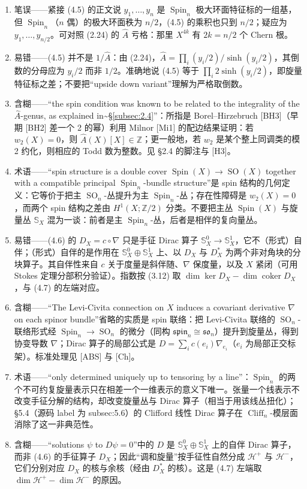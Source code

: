 \documentclass[11pt]{amsart}
\theoremstyle{definition}
\theoremstyle{remark}
\theoremstyle{plain}
\numberwithin{equation}{section}
\renewcommand{\:}{\colon}
\newcommand{\Ahat}{{\hat A}}
\DeclareMathOperator{\Spin}{Spin}
\newcommand{\ZZ}{{\mathbb Z}}
\DeclareMathOperator{\coker}{coker}
\DeclareMathOperator{\SO}{SO}
\DeclareMathOperator{\Cliff}{Cliff}
\newcommand{\sH}{\mathscr{H}}
\renewcommand{\SS}{\mathbb{S}}
\begin{document}
\begin{enumerate}[leftmargin=2.2em,itemsep=2pt,topsep=2pt]
  \item 笔误——紧接 (4.5) 的正文说 $y_1,\dots ,y_n$ 是 $\Spin_n$ 极大环面特征标的一组基，但 $\Spin_n$（$n$ 偶）的极大环面秩为 $n/2$，(4.5) 的乘积也只到 $n/2$；疑应为 $y_1,\dots ,y_{n/2}$。可对照 (2.24) 的 $\Ahat$ 亏格：那里 $X^{4k}$ 有 $2k=n/2$ 个 Chern 根。
  \item 易错——(4.5) 并不是 $1/\Ahat$：由 (2.24)，$\Ahat=\prod_i (y_i/2)/\sinh(y_i/2)$，其倒数的分母应为 $y_i/2$ 而非 $1/2$。准确地说 (4.5) 等于 $\prod_i 2\sinh(y_i/2)$，即旋量特征标之差；不要把“upside down variant”理解为严格取倒数。
  \item 含糊——“the spin condition was known to be related to the integrality of the $\Ahat$-genus, as explained in\textasciitilde{}\S\ref{subsec:2.4}”：所指是 Borel–Hirzebruch [BH3]（早期 [BH2] 差一个 2 的幂）利用 Milnor [Mi1] 的配边结果证明：若 $w_2(X)=0$，则 $\Ahat(X)[X]\in\ZZ$；更一般地，若 $w_2$ 是某个整上同调类的模 2 约化，则相应的 Todd 数为整数。见 §2.4 的脚注与 [H3]。
  \item 术语——“spin structure is a double cover $\Spin(X)\to\SO(X)$ together with a compatible principal $\Spin_n$-bundle structure”是 spin 结构的几何定义：它等价于把主 $\SO_n$-丛提升为主 $\Spin_n$-丛；存在性障碍是 $w_2(X)=0$，而两个 spin 结构之差由 $H^1(X;\ZZ/2)$ 分类。不要把主丛 $\Spin(X)$ 与旋量丛 $\SS_X$ 混为一谈：前者是主 $\Spin_n$-丛，后者是相伴的复向量丛。
  \item 易错——(4.6) 的 $D_X=c\circ\nabla$ 只是手征 Dirac 算子 $\SS^0_X\to\SS^1_X$，它不（形式）自伴；（形式）自伴的是作用在 $\SS^0_X\oplus\SS^1_X$ 上、以 $D_X$ 与 $D_X^*$ 为两个非对角块的分块算子。其自伴性来自 $c$ 关于度量是斜伴随、$\nabla$ 保度量，以及 $X$ 紧闭（可用 Stokes 定理分部积分验证）。指数按 (3.12) 取 $\dim\ker D_X-\dim\coker D_X$，与 (4.7) 的左端对应。
  \item 含糊——“The Levi-Civita connection on $X$ induces a covariant derivative $\nabla$ on each spinor bundle”省略的实质是 spin 联络：把 Levi-Civita 联络的 $\SO_n$-联络形式经 $\Spin_n\to\SO_n$ 的微分（同构 $\mathfrak{spin}_n\cong\mathfrak{so}_n$）提升到旋量丛，得到协变导数 $\nabla$；Dirac 算子的局部公式是 $D=\sum_i c(e_i)\nabla_{e_i}$（$e_i$ 为局部正交标架）。标准处理见 [ABS] 与 [Ch]。
  \item 术语——“only determined uniquely up to tensoring by a line”：$\Spin_n$ 的两个不可约复旋量表示只在相差一个一维表示的意义下唯一。张量一个线表示不改变手征分解的结构，却改变旋量丛与 Dirac 算子（相当于用该线丛扭化）；§5.4（源码 label 为 subsec:5.6）的 Clifford 线性 Dirac 算子在 $\Cliff_n$-模层面消除了这一非典范性。
  \item 含糊——“solutions $\psi$ to $D\psi=0$”中的 $D$ 是 $\SS^0_X\oplus\SS^1_X$ 上的自伴 Dirac 算子，而非 (4.6) 的手征算子 $D_X$；因此“调和旋量”按手征性自然分成 $\sH^+$ 与 $\sH^-$，它们分别对应 $D_X$ 的核与余核（经由 $D_X^*$ 的核）。这是 (4.7) 左端取 $\dim\sH^+-\dim\sH^-$ 的原因。

\end{enumerate}
\end{document}
